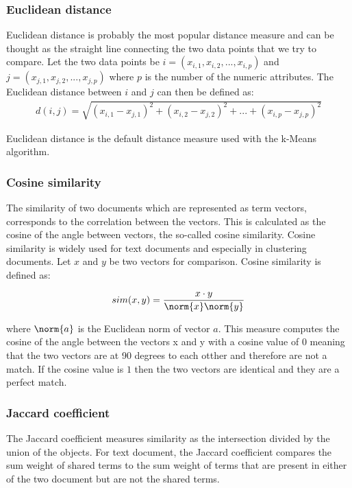 \subsubsection{Euclidean distance}
Euclidean distance is probably the most popular distance measure and can be thought as the straight line connecting the two data points that we try to compare.
Let the two data points be $i = (x_{i,1}, x_{i,2},...,x_{i,p})$ and $j = (x_{j,1}, x_{j,2},...,x_{j,p})$ where $p$ is the number of the numeric attributes. The Euclidean distance between $i$ and $j$ can then be defined as:\\
\begin{eqnarray}
d(i,j) = \sqrt{(x_{i,1} - x_{j,1})^2 + (x_{i,2} - x_{j,2})^2 + ... +(x_{i,p} - x_{j,p})^2 }
\end{eqnarray} 

Euclidean distance is the default distance measure used with the k-Means algorithm. 

\subsubsection{Cosine similarity}
The similarity of two documents which are represented as term vectors, corresponds to the correlation between the vectors. This is calculated as the cosine of the
angle between vectors, the so-called cosine similarity. Cosine similarity is widely used for text documents and especially in clustering documents. Let $x$ and $y$ be 
two vectors for comparison. Cosine similarity is defined as:

\begin{eqnarray}
sim(x,y) = \frac{x \cdot y }{\norm{x} \norm{y}} 
\end{eqnarray} 

where $\norm{a}$ is the Euclidean norm of vector $a$. This measure computes the cosine of the angle between the vectors x and y with a cosine value of $0$ meaning that the two vectors are at 90 degrees to each otther and therefore are not a match. If the cosine value is $1$ then the two vectors are identical and they are a perfect match. 

\subsubsection{Jaccard coefficient}
The Jaccard coeﬃcient measures similarity as the intersection divided by the union of the objects. For text document, the Jaccard coeﬃcient compares the sum weight of shared terms to the sum weight of terms that are present in either of the two document but are not the shared terms.

